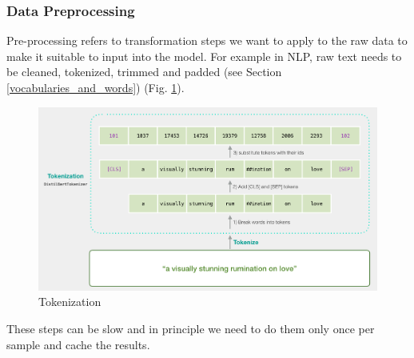 \subsubsection{Data Preprocessing}
Pre-processing refers to transformation steps we want to apply to the raw data to make it suitable to input into the model.
For example in NLP, raw text needs to be cleaned, tokenized, trimmed and padded (see Section \ref{vocabularies_and_words}) (Fig. \ref{fig:tokenization}).
\begin{figure}
    \includegraphics[width=\linewidth]{chapters/NLP/figures/tokenization.png}
    \caption{Tokenization}
    \label{fig:tokenization}
\end{figure}
These steps can be slow and in principle we need to do them only once per sample and cache the results.

